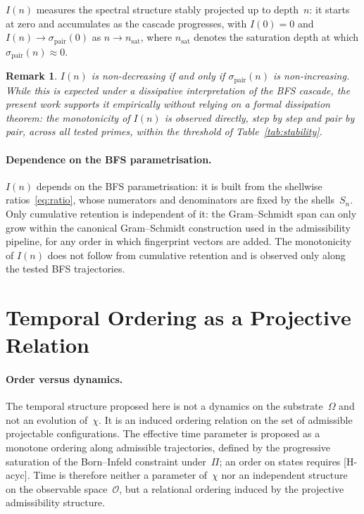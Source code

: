 \documentclass[11pt,a4paper]{article}
\newtheorem{remark}{Remark}
\begin{document}
  $I(n)$ measures the spectral structure stably projected up to depth~$n$:
  it starts at zero and accumulates as the cascade progresses, with
  $I(0) = 0$ and $I(n) \to \sigma_{\mathrm{pair}}(0)$ as
  $n \to n_{\mathrm{sat}}$, where $n_{\mathrm{sat}}$ denotes the
  saturation depth at which $\sigma_{\mathrm{pair}}(n) \approx 0$.

  \begin{remark}
    $I(n)$ is non-decreasing if and only if $\sigma_{\mathrm{pair}}(n)$ is
    non-increasing.
    While this is expected under a dissipative interpretation of the BFS
    cascade, the present work supports it empirically without relying on
    a formal dissipation theorem: the monotonicity of $I(n)$ is observed
    directly, step by step and pair by pair, across all tested primes, within
    the threshold of Table~\ref{tab:stability}.
  \end{remark}

  \paragraph{Dependence on the BFS parametrisation.}
    $I(n)$ depends on the BFS parametrisation: it is built from the shellwise
    ratios~\eqref{eq:ratio}, whose numerators and denominators are fixed by the
    shells~$S_n$.
    Only cumulative retention is independent of it: the Gram--Schmidt span can
    only grow within the canonical Gram--Schmidt construction used in the
    admissibility pipeline, for any order in which fingerprint vectors are added.
    The monotonicity of $I(n)$ does not follow from cumulative retention and is
    observed only along the tested BFS trajectories.

  \section{Temporal Ordering as a Projective Relation}

  \paragraph{Order versus dynamics.}
    The temporal structure proposed here is not a dynamics on the
    substrate~$\Omega$ and not an evolution of~$\chi$.
    It is an induced ordering relation on the set of admissible projectable
    configurations.
    The effective time parameter is proposed as a monotone ordering along admissible
    trajectories, defined by the progressive saturation of the Born--Infeld
    constraint under~$\Pi$; an order on states requires [H-acyc].
    Time is therefore neither a parameter of~$\chi$ nor an independent
    structure on the observable space~$\mathcal{O}$, but a relational
    ordering induced by the projective admissibility structure.
\end{document}
